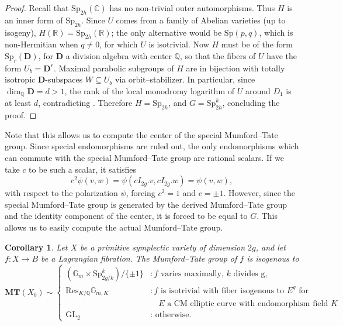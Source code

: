 \documentclass[12pt]{amsart}
\newcommand{\R}{\mathbb{R}}
\newcommand{\Q}{\mathbb{Q}}
\newcommand{\C}{\mathbb{C}}
\newcommand{\Sp}{\mathrm{Sp}}
\newcommand{\GL}{\mathrm{GL}}
\newtheorem{corollary}[theorem]{Corollary}
\theoremstyle{definition}
\numberwithin{equation}{section}
\begin{document}
\begin{proof}
Recall that \(\Sp_{2h}(\C)\) has no non-trivial outer automorphisms. Thus 
\(H\) is an inner form of \(\Sp_{2h}\). Since \(U\) comes from a family of 
Abelian varieties (up to isogeny), \(H(\R) = \Sp_{2h}(\R)\); the only alternative 
would be \(\Sp(p, q)\), which is non-Hermitian when \(q \neq 0\), 
for which \(U\) is isotrivial. Now \(H\) must be of the form \(\Sp_r(\mathbf{D})\), for 
\(\mathbf{D}\) a division algebra with center \(\Q\), so that the fibers of \(U\) have 
the form \(U_b = \mathbf{D}^r\). Maximal parabolic subgroups of \(H\) are in bijection 
with totally isotropic \(\mathbf{D}\)-subspaces \(W \subseteq U_b\) via orbit--stabilizer. 
In particular, since \(\dim_\Q \mathbf D = d > 1\), the rank of the local monodromy logarithm of 
\(U\) around \(D_1\) is at least \(d\), contradicting .
Therefore \(H = \Sp_{2h}\), and \(G = \Sp_{2h}^k\), concluding the proof. 
\end{proof}


Note that this allows us to compute the center of the special Mumford--Tate group. 
Since special endomorphisms are ruled out, the only endomorphisms which can 
commute with the special Mumford--Tate group are rational scalars. 
If we take \(c\) to be such a scalar, it satisfies 
\begin{equation*}
    c^2 \psi(v, w) = \psi(c I_{2g}.v, c I_{2g}.w) = \psi(v, w),
\end{equation*}
with respect to the polarization \(\psi\), forcing \(c^2 = 1\) and \(c = \pm 1\). 
However, since the special Mumford--Tate group is generated by the derived Mumford--Tate 
group and the identity component of the center, it is forced to be equal to \(G\).
This allows us to easily compute the actual Mumford--Tate group.

\begin{corollary} \label{mt-classification}
    Let \(X\) be a primitive symplectic variety of dimension \(2g\), and let 
    \(f: X \to B\) be a Lagrangian fibration. The Mumford--Tate group of 
    \(f\) is isogenous to 
    \begin{equation*}
        \mathbf{MT}(X_b) \sim \begin{cases}
            (\mathbb{G}_m \times \Sp_{2g/k}^k) / \{\pm 1\} & : f \text{ varies maximally, } 
            k \text{ divides g,}\\
            \mathrm{Res}_{K/\Q} \mathbb{G}_{m, K} & : 
            f \text{ is isotrivial with fiber isogenous to } E^g \text{ for } \\
            & \quad  E \text{ a CM elliptic curve with endomorphism field } K\\
            \GL_2 & : \text{ otherwise.}
        \end{cases}
    \end{equation*}
\end{corollary}
\end{document}
